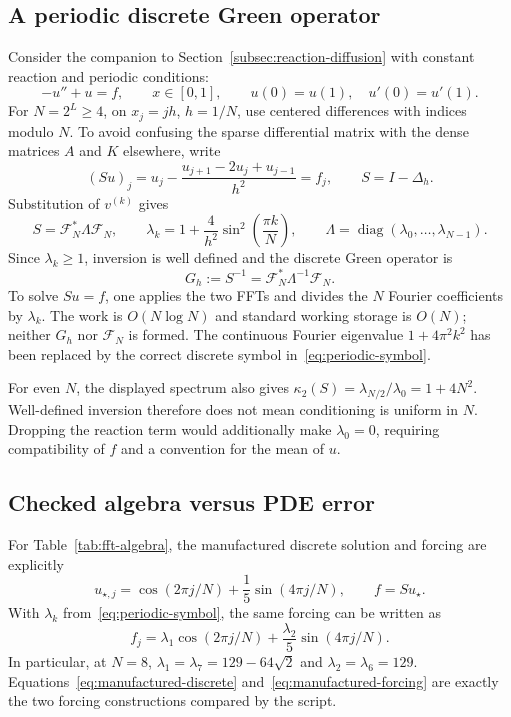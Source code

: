 \documentclass[11pt,a4paper]{article}
\begin{document}
\subsection{A periodic discrete Green operator}
Consider the companion to Section~\ref{subsec:reaction-diffusion} with constant reaction and periodic conditions:
\begin{equation}
 -u''+u=f,\qquad x\in[0,1],\qquad u(0)=u(1),\quad u'(0)=u'(1).
 \label{eq:periodic-pde}
\end{equation}
For $N=2^L\ge4$, on $x_j=jh$, $h=1/N$, use centered differences with indices modulo $N$. To avoid confusing the sparse differential matrix with the dense matrices $A$ and $K$ elsewhere, write
\begin{equation}
 (Su)_j=u_j-\frac{u_{j+1}-2u_j+u_{j-1}}{h^2}=f_j,
 \qquad S=I-\Delta_h.
 \label{eq:periodic-stencil}
\end{equation}
Substitution of $v^{(k)}$ gives
\begin{equation}
 S=\mathcal F_N^*\Lambda\mathcal F_N,
 \qquad
 \lambda_k=1+\frac4{h^2}\sin^2\!\left(\frac{\pi k}{N}\right),\qquad
 \Lambda=\operatorname{diag}(\lambda_0,\ldots,\lambda_{N-1}).
 \label{eq:periodic-symbol}
\end{equation}
Since $\lambda_k\ge1$, inversion is well defined and the discrete Green operator is
\begin{equation}
 G_h:=S^{-1}=\mathcal F_N^*\Lambda^{-1}\mathcal F_N.
 \label{eq:periodic-green}
\end{equation}
To solve $Su=f$, one applies the two FFTs and divides the $N$ Fourier coefficients by $\lambda_k$. The work is $O(N\log N)$ and standard working storage is $O(N)$; neither $G_h$ nor $\mathcal F_N$ is formed. The continuous Fourier eigenvalue $1+4\pi^2k^2$ has been replaced by the correct discrete symbol in~\eqref{eq:periodic-symbol}.

For even $N$, the displayed spectrum also gives $\kappa_2(S)=\lambda_{N/2}/\lambda_0=1+4N^2$. Well-defined inversion therefore does not mean conditioning is uniform in $N$. Dropping the reaction term would additionally make $\lambda_0=0$, requiring compatibility of $f$ and a convention for the mean of $u$.

\subsection{Checked algebra versus PDE error}
\label{sec:fft-checks}
For Table~\ref{tab:fft-algebra}, the manufactured discrete solution and forcing are explicitly
\begin{equation}
 u_{\star,j}=\cos(2\pi j/N)+\frac15\sin(4\pi j/N),
 \qquad f=Su_\star.
 \label{eq:manufactured-discrete}
\end{equation}
With $\lambda_k$ from~\eqref{eq:periodic-symbol}, the same forcing can be written as
\begin{equation}
 f_j=\lambda_1\cos(2\pi j/N)+\frac{\lambda_2}{5}\sin(4\pi j/N).
 \label{eq:manufactured-forcing}
\end{equation}
In particular, at $N=8$, $\lambda_1=\lambda_7=129-64\sqrt2$ and $\lambda_2=\lambda_6=129$. Equations~\eqref{eq:manufactured-discrete} and~\eqref{eq:manufactured-forcing} are exactly the two forcing constructions compared by the script.
\end{document}
